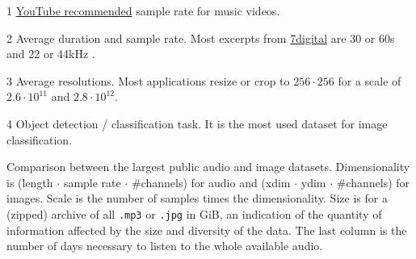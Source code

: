 \documentclass{article}
\begin{document}
\begin{table}[t]
\begin{threeparttable}
	\begin{tablenotes}
		\item[1] \href{https://support.google.com/youtube/answer/6039860}{YouTube recommended} sample rate for music videos.
		\item[2] Average duration and sample rate. Most excerpts from \href{https://www.7digital.com}{7digital} are 30 or 60s and 22 or 44kHz \cite{msd_features}.
		\item[3] Average resolutions. Most applications resize or crop to $256\cdot256$ for a scale of $2.6\cdot10^{11}$ and $2.8\cdot10^{12}$.
		\item[4] Object detection / classification task. It is the most used dataset for image classification.
	\end{tablenotes}
	\end{threeparttable}
	\caption{Comparison between the largest public audio and image datasets. Dimensionality is (length $\cdot$ sample rate $\cdot$ \#channels) for audio and (xdim $\cdot$ ydim $\cdot$ \#channels) for images. Scale is the number of samples times the dimensionality. Size is for a (zipped) archive of all \texttt{.mp3} or \texttt{.jpg} in GiB, an indication of the quantity of information affected by the size and diversity of the data. The last column is the number of days necessary to listen to the whole available audio.}
	\label{tab:size}
\end{table}

\end{document}
